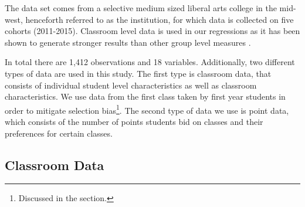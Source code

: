 The data set comes from a selective medium sized liberal arts college in the mid-west, henceforth referred to as the institution, for which data is collected on five cohorts (2011-2015). 
Classroom level data is used in our regressions as it has been shown to generate stronger results than other group level measures \citep{burke2013classroom}. 

In total there are 1,412 observations and 18 variables. 
Additionally, two different types of data are used in this study. 
The first type is classroom data, that consists of individual student level characteristics as well as classroom characteristics. 
We use data from the first class taken by first year students in order to mitigate selection bias\footnote{Discussed in the  section.}. 
The second type of data we use is point data, which consists of the number of points students bid on classes and their preferences for certain classes. 

\subsection{Classroom Data}\label{data:classdata}


